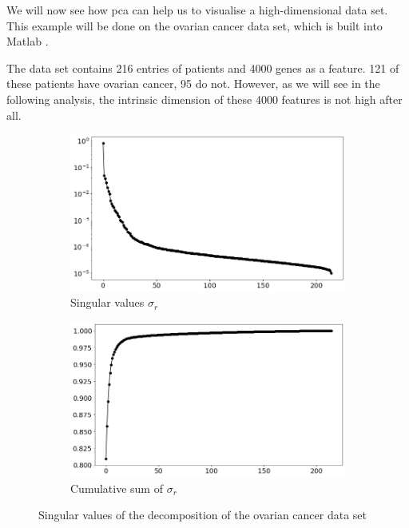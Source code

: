 We will now see how \gls{pca} can help us to visualise a high-dimensional data set.
This example will be done on the ovarian cancer data set, which is built into Matlab \cite{brunton2019data}.

The data set contains 216 entries of patients and 4000 genes as a feature.
121 of these patients have ovarian cancer, 95 do not.
However, as we will see in the following analysis, the intrinsic dimension of these 4000 features is not high after all.

\begin{figure}[h]
  \centering
  \begin{subfigure}{0.49\textwidth}
      \includegraphics[width=\textwidth]{external_content/media/ovarian_cancer/explained_variance.png}
      \caption{Singular values $\sigma_r$}
      \label{fig:ovarianLog}
  \end{subfigure}
  \hfill
  \begin{subfigure}{0.49\textwidth}
      \includegraphics[width=\textwidth]{external_content/media/ovarian_cancer/cumulative_sum.png}
      \caption{Cumulative sum of $\sigma_r$}
      \label{fig:ovarianCumsum}
  \end{subfigure}
  \caption{Singular values of the decomposition of the ovarian cancer data set}
  \label{fig:ovarianSpecs}
\end{figure}


